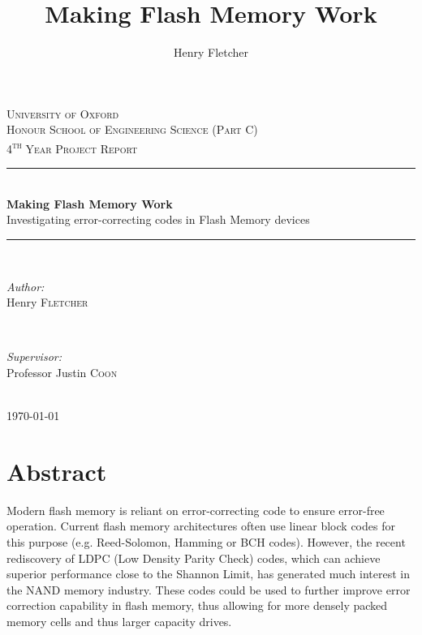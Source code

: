 \documentclass[11pt]{article}
\author{Henry Fletcher}
\title{Making Flash Memory Work}
\numberwithin{equation}{subsection}
\begin{document}
\begin{titlepage}

\newcommand{\HRule}{\rule{\linewidth}{0.5mm}}

\center
 
\textsc{\LARGE University of Oxford}\\[1.5cm] 
\textsc{\Large Honour School of Engineering Science (Part C)}\\[0.5cm]
\textsc{\large 4\textsuperscript{th} Year Project Report}\\[0.5cm]
\HRule \\[0.7cm]
{ \huge \bfseries Making Flash Memory Work}\\[0.2cm] %
{ \large Investigating error-correcting codes in Flash Memory devices}
\HRule \\[0.7cm]
\begin{minipage}{0.4\textwidth}
\begin{flushleft} \large
\emph{Author:}\\
Henry \textsc{Fletcher} %
\end{flushleft}
\end{minipage}
~
\begin{minipage}{0.4\textwidth}
\begin{flushright} \large
\emph{Supervisor:} \\
Professor Justin \textsc{Coon} %
\end{flushright}
\end{minipage}\\[13cm]

{\large \today}\\[1cm]

\vfill 

\end{titlepage}


\section*{Abstract}

Modern flash memory is reliant on error-correcting code to ensure error-free operation. Current flash memory architectures often use linear block codes for this purpose (e.g. Reed-Solomon, Hamming or BCH codes). However, the recent rediscovery of LDPC (Low Density Parity Check) codes, which can achieve superior performance close to the Shannon Limit, has generated much interest in the NAND memory industry. These codes could be used to further improve error correction capability in flash memory, thus allowing for more densely packed memory cells and thus larger capacity drives.
\end{document}

